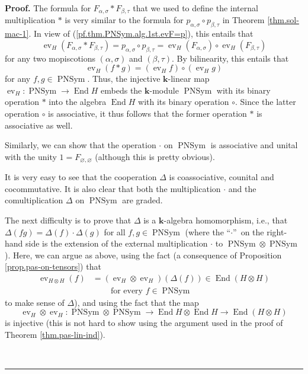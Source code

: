 \documentclass[numbers=enddot,12pt,final,onecolumn,notitlepage]{scrartcl}%
\theoremstyle{definition}
\newenvironment{proof}[1][Proof]{\noindent\textbf{#1.} }{\ \rule{0.5em}{0.5em}}
\begin{document}
\begin{proof}
The formula for $F_{\alpha,\sigma}\ast F_{\beta,\tau}$ that we used to define
the internal multiplication $\ast$ is very similar to the formula for
$p_{\alpha,\sigma}\circ p_{\beta,\tau}$ in Theorem \ref{thm.sol-mac-1}. In
view of (\ref{pf.thm.PNSym.alg.1st.evF=p}), this entails that%
\[
\operatorname*{ev}\nolimits_{H}\left(  F_{\alpha,\sigma}\ast F_{\beta,\tau
}\right)  =p_{\alpha,\sigma}\circ p_{\beta,\tau}=\operatorname*{ev}%
\nolimits_{H}\left(  F_{\alpha,\sigma}\right)  \circ\operatorname*{ev}%
\nolimits_{H}\left(  F_{\beta,\tau}\right)
\]
for any two mopiscotions $\left(  \alpha,\sigma\right)  $ and $\left(
\beta,\tau\right)  $. By bilinearity, this entails that%
\[
\operatorname*{ev}\nolimits_{H}\left(  f\ast g\right)  =\left(
\operatorname*{ev}\nolimits_{H}f\right)  \circ\left(  \operatorname*{ev}%
\nolimits_{H}g\right)
\]
for any $f,g\in\operatorname*{PNSym}$. Thus, the injective $\mathbf{k}$-linear
map $\operatorname*{ev}\nolimits_{H}:\operatorname*{PNSym}\rightarrow
\operatorname*{End}H$ embeds the $\mathbf{k}$-module $\operatorname*{PNSym}$
with its binary operation $\ast$ into the algebra $\operatorname*{End}H$ with
its binary operation $\circ$. Since the latter operation $\circ$ is
associative, it thus follows that the former operation $\ast$ is associative
as well.

Similarly, we can show that the operation $\cdot$ on $\operatorname*{PNSym}$
is associative and unital with the unity $1=F_{\varnothing,\varnothing}$
(although this is pretty obvious).

It is very easy to see that the cooperation $\Delta$ is coassociative,
counital and cocommutative. It is also clear that both the multiplication
$\cdot$ and the comultiplication $\Delta$ on $\operatorname*{PNSym}$ are graded.

The next difficulty is to prove that $\Delta$ is a $\mathbf{k}$-algebra
homomorphism, i.e., that $\Delta\left(  fg\right)  =\Delta\left(  f\right)
\cdot\Delta\left(  g\right)  $ for all $f,g\in\operatorname*{PNSym}$ (where
the \textquotedblleft$\cdot$\textquotedblright\ on the right-hand side is the
extension of the external multiplication $\cdot$ to $\operatorname*{PNSym}%
\otimes\operatorname*{PNSym}$). Here, we can argue as above, using the fact (a
consequence of Proposition \ref{prop.pas-on-tensors}) that%
\begin{align*}
\operatorname*{ev}\nolimits_{H\otimes H}\left(  f\right)   &  =\left(
\operatorname*{ev}\nolimits_{H}\otimes\operatorname*{ev}\nolimits_{H}\right)
\left(  \Delta\left(  f\right)  \right)  \in\operatorname*{End}\left(
H\otimes H\right) \\
&  \ \ \ \ \ \ \ \ \ \ \text{for every }f\in\operatorname*{PNSym}%
\end{align*}
to make sense of $\Delta$), and using the fact that the map
\[
\operatorname*{ev}\nolimits_{H}\otimes\operatorname*{ev}\nolimits_{H}%
:\operatorname*{PNSym}\otimes\operatorname*{PNSym}\rightarrow
\operatorname*{End}H\otimes\operatorname*{End}H\rightarrow\operatorname*{End}%
\left(  H\otimes H\right)
\]
is injective (this is not hard to show using the argument used in the proof of
Theorem \ref{thm.pas-lin-ind}).


\end{proof}
\end{document}
